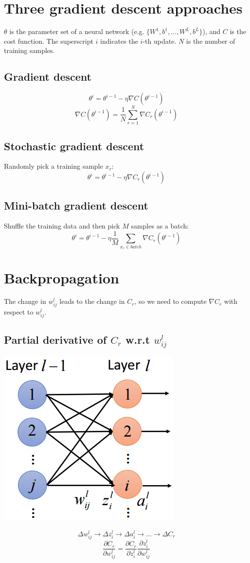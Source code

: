 \documentclass{article}
\begin{document}
\section{Three gradient descent approaches}
$\theta$ is the parameter set of a neural network (e.g. $\{W^1, b^1, ..., W^L, b^L\}$), and $C$ is the cost function. The superscript $i$ indicates the $i$-th update. $N$ is the number of training samples.
\subsection{Gradient descent}
\[
\theta^i = \theta^{i-1} - \eta\nabla C(\theta^{i-1})
\]
\[
\nabla C(\theta^{i-1}) = \frac{1}{N}\sum_{r = 1}^N\nabla C _r(\theta^{i-1})
\]
\subsection{Stochastic gradient descent}
Randomly pick a training sample $x_r$:
\[
\theta^i = \theta^{i-1} - \eta \nabla C_r(\theta^{i-1})
\]
\subsection{Mini-batch gradient descent}
Shuffle the training data and then pick $M$ samples as a batch:
\[
\theta^i = \theta^{i-1} - \eta \frac{1}{M}\sum_{x_r\in batch}\nabla C_r(\theta^{i-1})
\]

\section{Backpropagation}
The change in $w^l_{ij}$ leads to the change in $C_r$, so we need to compute $\nabla C_r$ with respect to $w^l_{ij}$.

\subsection{Partial derivative of $C_r$ w.r.t $w^l_{ij}$}
\begin{center}
\includegraphics[scale=0.4]{grad_ctow}
\end{center}
\[
\Delta w^l_{ij}\rightarrow \Delta z^l_i\rightarrow \Delta a^l_i \rightarrow \dots \rightarrow \Delta C_r 
\]
\[
\frac{\partial C_r}{\partial w^l_{ij}} = \frac{\partial C_r}{\partial z^l_i}\frac{\partial z^l_i}{\partial w^l_{ij}}
\]
\end{document}
